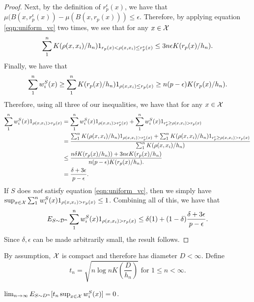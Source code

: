 \begin{proof}
Next, by the definition of $r_p^\epsilon(x)$, we have that $\mu(B(x, r_p^\epsilon(x)) - \mu(B(x,r_p(x))) \leq \epsilon$. Therefore, by applying equation \ref{eqn:uniform_vc} two times, we see that for any $x \in \mathcal X$ $$\sum_1^n K(\rho(x, x_i)/h_n)1_{r_p(x) < \rho(x, x_i) \leq r_p^\epsilon(x)} \leq 3n\epsilon K(r_p(x)/h_n).$$ Finally, we have that $$\sum_1^n w_i^S(x) \geq \sum_1^n K(r_p(x)/h_n)1_{\rho(x, x_i) \leq r_p(x)} \geq n(p - \epsilon)K(r_p(x)/h_n).$$ Therefore, using all three of our inequalities, we have that for any $x \in \mathcal X$
\begin{equation*}
\begin{split}
\sum_1^n w_i^S(x)1_{\rho(x, x_i) > r_p(x)} &= \sum_1^n w_i^S(x)1_{\rho(x, x_i) > r_p^\epsilon(x)} + \sum_1^n w_i^S(x)1_{r_p^\epsilon \geq \rho(x, x_i) > r_p(x)} \\
&= \frac{\sum_1^n K(\rho(x, x_i)/h_n)1_{\rho(x, x_i) > r_p^\epsilon(x)} + \sum_1^n K(\rho(x, x_i)/h_n)1_{r_p^\epsilon \geq \rho(x, x_i) > r_p(x)}}{\sum_1^n K(\rho(x, x_i)/h_n)} \\
&\leq \frac{ n\delta K(r_p(x)/h_n)) + 3n\epsilon K(r_p(x)/h_n)}{n(p - \epsilon)K(r_p(x)/h_n).} \\
&= \frac{\delta + 3\epsilon}{p - \epsilon}.
\end{split}
\end{equation*}
If $S$ does \textit{not} satisfy equation \ref{eqn:uniform_vc}, then we simply have $\sup_{x \in \mathcal X} \sum_1^n w_i^S(x)1_{\rho(x, x_i) > r_p(x)} \leq 1$. Combining all of this, we have that 
$$E_{S \sim {\mathcal D}^n} \sum_1^n w_i^S(x)1_{\rho(x, x_i) > r_p(x)} \leq \delta(1) + (1-\delta)\frac{\delta + 3\epsilon}{p - \epsilon}.$$ Since $\delta, \epsilon$ can be made arbitrarily small, the result follows. 
\end{proof}

By assumption, $\mathcal X$ is compact and therefore has diameter $D < \infty$. Define $$t_ n = \sqrt{n\log nK(\frac{D}{h_n})}\text{ for }1 \leq n < \infty.$$

\begin{lem}\label{cl:kern_tn}
$\lim_{n \to \infty} E_{S \sim D^n}[t_n \sup_{x \in \mathcal X} w_i^S(x)] = 0$.
\end{lem}

